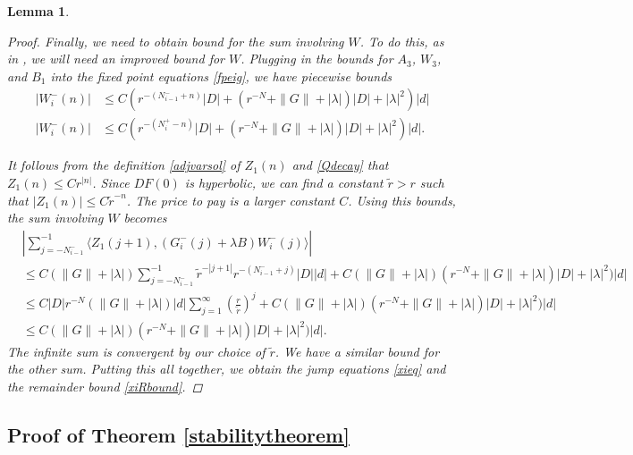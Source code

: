 \documentclass[12pt]{elsarticle}
\newtheorem{lemma}{Lemma}
\begin{document}
\begin{lemma}
\begin{proof}
Finally, we need to obtain bound for the sum involving $W$. To do this, as in \cite{Sandstede1998}, we will need an improved bound for $W$. Plugging in the bounds for $A_3$, $W_3$, and $B_1$ into the fixed point equations \cref{fpeig}, we have piecewise bounds
\begin{align*}
|W_i^-(n)| &\leq C( r^{-(N_{i-1}^- + n)}|D| +  
(r^{-N} + \|G\| + |\lambda|)|D| + |\lambda|^2 )|d| \\
|W_i^-(n)| &\leq C( r^{-(N_i^+ - n)}|D| +  
(r^{-N} + \|G\| + |\lambda|)|D| + |\lambda|^2 )|d|.
\end{align*}

It follows from the definition \eqref{adjvarsol} of $Z_1(n)$ and \cref{Qdecay} that $Z_1(n) \leq C r^{|n|}$. Since $D F(0)$ is hyperbolic, we can find a constant $\tilde{r} > r$ such that $|Z_1(n)| \leq C \tilde{r}^{-n}$. The price to pay is a larger constant $C$. Using this bounds, the sum involving $W$ becomes
\begin{align*}
&\left| \sum_{j = -N_{i-1}^-}^{-1} \langle Z_1(j+1), 
(G_i^-(j) + \lambda B) W_i^-(j) \rangle \right| \\
&\leq C (\|G\| + |\lambda|) \sum_{j = -N_{i-1}^-}^{-1} \tilde{r}^{-|j+1|} r^{-(N_{i-1}^- + j)}|D||d| + C (\|G\| + |\lambda|)(r^{-N} + \|G\| + |\lambda|)|D| + |\lambda|^2 )|d| \\
&\leq C |D| r^{-N} (\|G\| + |\lambda|)|d| \sum_{j = 1}^\infty \left( \frac{r}{\tilde{r}}\right)^j + C (\|G\| + |\lambda|)(r^{-N} + \|G\| + |\lambda|)|D| + |\lambda|^2 )|d| \\
&\leq C (\|G\| + |\lambda|)(r^{-N} + \|G\| + |\lambda|)|D| + |\lambda|^2 )|d|.
\end{align*}
The infinite sum is convergent by our choice of $\tilde{r}$. We have a similar bound for the other sum. Putting this all together, we obtain the jump equations \cref{xieq} and the remainder bound \cref{xiRbound}.
\end{proof}
\end{lemma}

\subsection{Proof of Theorem \ref{stabilitytheorem}}
\end{document}
